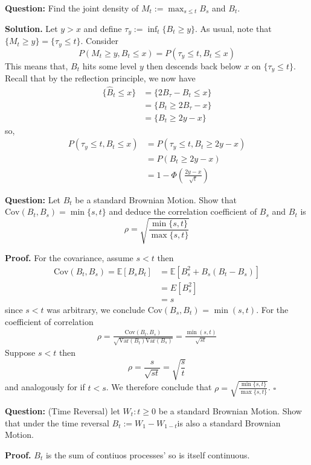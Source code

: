 \documentclass{article}
\begin{document}
\begin{tcolorbox}[colframe=black,colback=gray!5,boxrule=0.5pt]
\textbf{Question:} Find the joint density of $M_t := \max_{s\leq t} B_s$ and $B_t$. \cite{Fima}
\end{tcolorbox}
\textbf{Solution.} Let $y > x$ and define $\tau_y := \inf_{t}\{B_t \geq y\}$. As usual, note that $\{M_t \geq y\} = \{\tau_y\leq t\}$. Consider 
$$P(M_t\geq y, B_t\leq x) = P(\tau_y\leq t, B_t\leq x)$$
This means that, $B_t$ hits some level $y$ then descends back below $x$ on $\{\tau_y\leq t\}$. Recall that by the reflection principle, we now have 
\begin{align*}
    \{\hat{B}_t \leq x\} &= \{2B_{\tau} - B_t \leq x\} \\
    &= \{B_t\geq 2B_\tau - x\} \\
    &= \{B_t\geq 2y - x\}
\end{align*}
so, 
\begin{align*}
    P(\tau_y\leq t, B_t\leq x) &= P(\tau_y\leq t, B_t\geq2y- x) \\
    &= P(B_{t}\geq 2y-x) \\
    &= 1 - \Phi\left(\frac{2y-x}{\sqrt{t}}\right)
\end{align*}

\begin{tcolorbox}[colframe=black,colback=gray!5,boxrule=0.5pt]
\textbf{Question:} Let $B_t$ be a standard Brownian Motion. Show that $\text{Cov}(B_t,B_s) = \min\{s,t\}$ and deduce the correlation coefficient of $B_s$ and $B_t$ is $$\rho=\sqrt{\frac{\min\{s,t\}}{\max\{s,t\}}}$$
\end{tcolorbox}
\textbf{Proof.} For the covariance, assume $s<t$ then
\begin{align*}
    \text{Cov}(B_t,B_s) = \mathbb{E}[B_sB_t] &= \mathbb{E}[B_s^2+B_s(B_t-B_s)] \\
    &= E[B_s^2] \\
    &=s
\end{align*}
since $s<t$ was arbitrary, we conclude Cov$(B_s,B_t)$ = $\min(s,t)$. For the coefficient of correlation
\begin{align*}
    \rho = \frac{\text{Cov}(B_t,B_s)}{\sqrt{\text{Var}(B_t)\text{Var}(B_s)}} = \frac{\min(s,t)}{\sqrt{st}}
\end{align*}
Suppose $s<t$ then 
$$\rho = \frac{s}{\sqrt{st}} = \sqrt{\frac{s}{t}}$$
and analogously for if $t<s$. We therefore conclude that  $\rho=\sqrt{\frac{\min\{s,t\}}{\max\{s,t\}}}$. $\square$

\begin{tcolorbox}[colframe=black,colback=gray!5,boxrule=0.5pt]
\textbf{Question:} (Time Reversal) let $W_t: t\geq0$ be a standard Brownian Motion. Show that under the time reversal $B_t := W_1 - W_{1-t}$is also a standard Brownian Motion.
\end{tcolorbox}
\textbf{Proof.} $B_t$ is the sum of contiuos processes' so is itself continuous. 
\end{document}
